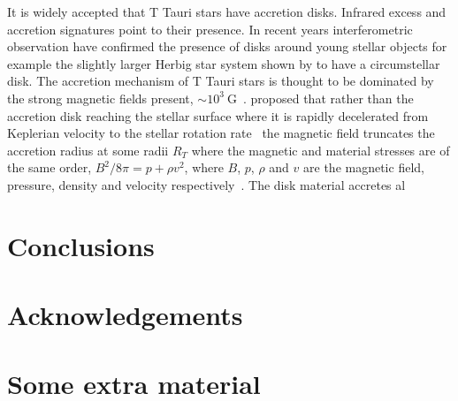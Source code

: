 \documentclass[fleqn,usenatbib]{mnras}
\begin{document}
It is widely accepted that T Tauri stars have
accretion disks. Infrared excess and accretion
signatures point to their presence. In recent years
interferometric observation have confirmed the
presence of disks around young stellar objects for
example the slightly larger Herbig star system shown
by \cite{2012ApJ...752...11K} to have a circumstellar
disk. The accretion mechanism of T Tauri stars is
thought to be dominated by the strong magnetic fields
present, $\sim 10^{3}~\textrm{G}$~\citep{2012MNRAS.426.2901K}.
\citet{1991ApJ...370L..39K} proposed that rather than
the accretion disk reaching the stellar surface where
it is rapidly decelerated from Keplerian velocity to
the stellar rotation rate~\citep{1992ApJ...386..229C}
the magnetic field truncates the accretion radius at some radii $R_T$ where the magnetic and material stresses are of the same order, $B^2/8\pi = p + \rho v^2$, where $B$, $p$, $\rho$ and $v$ are the magnetic field, pressure, density and velocity respectively~\citep{Romanova:2002hc}. The disk material accretes al











\section{Conclusions}

\section*{Acknowledgements}









\appendix

\section{Some extra material}



\bsp	%
\label{lastpage}
\end{document}
